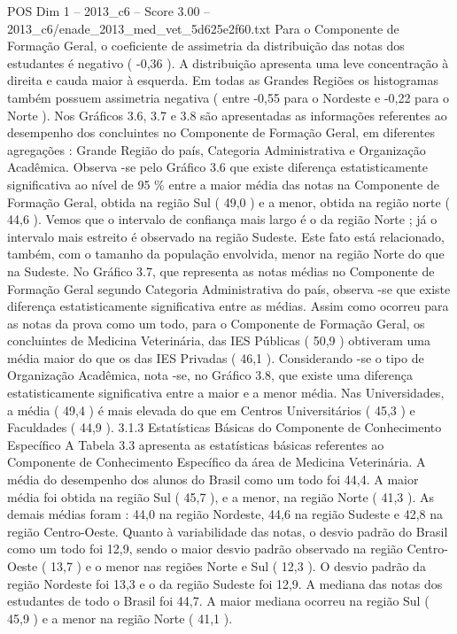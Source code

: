 \begin{textsample}{POS Dim 1 – 2013\_c6 – Score 3.00 – 2013\_c6/enade\_2013\_med\_vet\_5d625e2f60.txt}
Para o Componente de Formação Geral, o coeficiente de assimetria da distribuição das notas dos estudantes é negativo ( -0,36 ).
A distribuição apresenta uma leve concentração à direita e cauda maior à esquerda.
Em todas as Grandes Regiões os histogramas também possuem assimetria negativa ( entre -0,55 para o Nordeste e -0,22 para o Norte ).
Nos Gráficos 3.6, 3.7 e 3.8 são apresentadas as informações referentes ao desempenho dos concluintes no Componente de Formação Geral, em diferentes agregações : Grande Região do país, Categoria Administrativa e Organização Acadêmica.
Observa -se pelo Gráfico 3.6 que existe diferença estatisticamente significativa ao nível de 95 \% entre a maior média das notas na Componente de Formação Geral, obtida na região Sul ( 49,0 ) e a menor, obtida na região norte ( 44,6 ).
Vemos que o intervalo de confiança mais largo é o da região Norte ; já o intervalo mais estreito é observado na região Sudeste.
Este fato está relacionado, também, com o tamanho da população envolvida, menor na região Norte do que na Sudeste.
No Gráfico 3.7, que representa as notas médias no Componente de Formação Geral segundo Categoria Administrativa do país, observa -se que existe diferença estatisticamente significativa entre as médias.
Assim como ocorreu para as notas da prova como um todo, para o Componente de Formação Geral, os concluintes de Medicina Veterinária, das IES Públicas ( 50,9 ) obtiveram uma média maior do que os das IES Privadas ( 46,1 ).
Considerando -se o tipo de Organização Acadêmica, nota -se, no Gráfico 3.8, que existe uma diferença estatisticamente significativa entre a maior e a menor média.
Nas Universidades, a média ( 49,4 ) é mais elevada do que em Centros Universitários ( 45,3 ) e Faculdades ( 44,9 ). 3.1.3 Estatísticas Básicas do Componente de Conhecimento Específico A Tabela 3.3 apresenta as estatísticas básicas referentes ao Componente de Conhecimento Específico da área de Medicina Veterinária.
A média do desempenho dos alunos do Brasil como um todo foi 44,4.
A maior média foi obtida na região Sul ( 45,7 ), e a menor, na região Norte ( 41,3 ).
As demais médias foram : 44,0 na região Nordeste, 44,6 na região Sudeste e 42,8 na região Centro-Oeste.
Quanto à variabilidade das notas, o desvio padrão do Brasil como um todo foi 12,9, sendo o maior desvio padrão observado na região Centro-Oeste ( 13,7 ) e o menor nas regiões Norte e Sul ( 12,3 ).
O desvio padrão da região Nordeste foi 13,3 e o da região Sudeste foi 12,9.
A mediana das notas dos estudantes de todo o Brasil foi 44,7.
A maior mediana ocorreu na região Sul ( 45,9 ) e a menor na região Norte ( 41,1 ).

\end{textsample}
